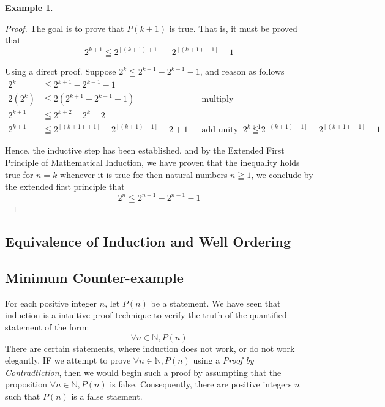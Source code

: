 \documentclass{book}
\theoremstyle{definition}
\newtheorem{example}{Example}[definition]
\theoremstyle{remark}
\newcommand{\bb}[1]{\mathbb{#1}}
\begin{document}
\begin{example}
\begin{proof}
    The goal is to prove that $P(k+1)$ is true. That is, it must be proved that  
        \begin{equation*}
            2^{k+1} \leqq 2^{[(k+1)+1]} - 2^{[(k+1)-1]} - 1 
        \end{equation*}
    
    Using a direct proof. Suppose $2^k \leqq 2^{k+1} - 2^{k-1} - 1$, and reason as follows
        \begin{align*}
            2^k & \leqq 2^{k+1} - 2^{k-1} - 1 \\
            2(2^k) & \leqq 2(2^{k+1} - 2^{k-1} - 1) && \text{multiply both sides by 2} \\     
            2^{k+1} & \leqq 2^{k+2} - 2^{k} - 2 \\
            2^{k+1} & \leqq 2^{[(k+1)+1]} - 2^{[(k+1)-1]} - 2 + 1 && \text{add unity to the bigger side}
            2^{k+1} & \leqq 2^{[(k+1)+1]} - 2^{[(k+1)-1]} - 1
        \end{align*}
    
    Hence, the inductive step has been established, and by the Extended First Principle of Mathematical Induction, we have proven that the inequality holds true for $n=k$ whenever it is true for then natural numbers $n \geqq 1$, we conclude by the extended first principle that
        \begin{equation*}
            2^n \leqq 2^{n+1} - 2^{n-1} - 1  
        \end{equation*}
 
\end{proof}
\end{example}



\newpage
\subsection{Equivalence of Induction and Well Ordering}






\newpage
\subsection{Minimum Counter-example}

For each positive integer $n$, let $P(n)$ be a statement. We have seen that induction is a intuitive proof technique to verify the truth of the quantified statement of the form:
    \begin{equation*}
        \forall n \in \bb{N}, P(n)
    \end{equation*}
There are certain statements, where induction does not work, or do not work elegantly. IF we attempt to prove $\forall n \in \bb{N}, P(n)$ using a \textit{Proof by Contradtiction}, then we would begin such a proof by assumpting that the proposition $\forall n \in \bb{N}, P(n)$ is false. Consequently, there are positive integers $n$ such that $P(n)$ is a false staement. \\
\end{document}
